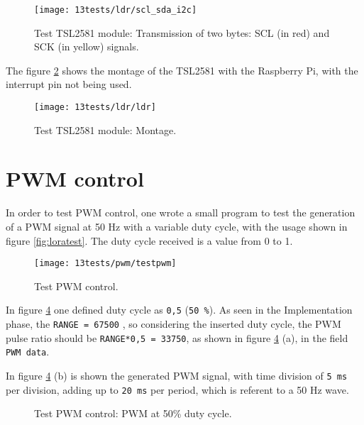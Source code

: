 \begin{figure}[H]
	\centering	
	\texttt{[image: 13tests/ldr/scl\_sda\_i2c]}
	\caption{Test TSL2581 module: Transmission of two bytes: SCL (in red) and SCK (in yellow) signals.}
	\label{fig:i2c_SCL_SDA}
\end{figure}

The figure \ref{fig:tsl} shows the montage of the TSL2581 with the Raspberry Pi, with the interrupt pin not being used.

\begin{figure}[H]
	\centering	
	\texttt{[image: 13tests/ldr/ldr]}
	\caption{Test TSL2581 module: Montage.}
	\label{fig:tsl}
\end{figure}

\section{PWM control}
In order to test PWM control, one wrote a small program to test the generation of a PWM signal at 50 Hz with a variable duty cycle, with the usage shown in figure \ref{fig:loratest}. The duty cycle received is a value from 0 to 1.

\begin{figure}[H]
	\centering	
	\texttt{[image: 13tests/pwm/testpwm]}
	\caption{Test PWM control.}
	\label{fig:testpwm}
\end{figure}

In figure \ref{fig:pwm_50} one defined duty cycle as \verb|0,5| (\verb+50 %+). As seen in the Implementation phase, the \verb+RANGE = 67500+ , so considering the inserted duty cycle, the PWM pulse ratio should be \verb|RANGE*0,5 = 33750|, as shown in figure \ref{fig:pwm_50} (a), in the field \verb|PWM data|.

In figure \ref{fig:pwm_50} (b) is shown the generated PWM signal, with time division of \verb+5 ms+ per division, adding up to \verb+20 ms+ per period, which is referent to a 50 Hz wave.

\begin{figure}[H]%
	\centering
	\qquad
	\caption{Test PWM control: PWM at 50\% duty cycle.}%
	\label{fig:pwm_50}%
\end{figure}

